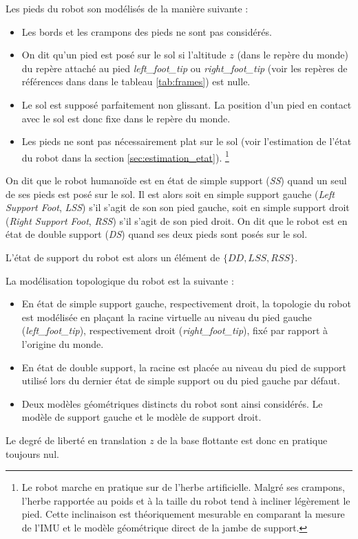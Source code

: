 Les pieds du robot son modélisés de la manière suivante :
\begin{itemize}
    \item Les bords et les crampons des pieds ne sont pas considérés.
    \item On dit qu'un pied est posé sur le sol si l'altitude $z$
    (dans le repère du monde) du repère attaché au pied 
    \textit{left\_foot\_tip} ou \textit{right\_foot\_tip} 
    (voir les repères de références dans dans le tableau \ref{tab:frames})
    est nulle.
    \item Le sol est supposé parfaitement non glissant. 
    La position d'un pied en contact avec le sol est donc fixe 
    dans le repère du monde.
    \item Les pieds ne sont pas nécessairement plat sur le sol 
    (voir l'estimation de l'état du robot dans la section \ref{sec:estimation_etat}).
    \footnote{Le robot marche en pratique sur de l'herbe artificielle. 
    Malgré ses crampons, l'herbe rapportée au poids et à la taille du robot tend à incliner légèrement le pied.
    Cette inclinaison est théoriquement mesurable en comparant la mesure de l'IMU 
    et le modèle géométrique direct de la jambe de support.}
\end{itemize}

\begin{definition}
    On dit que le robot humanoïde est en état de simple support (\textit{SS}) quand
    un seul de ses pieds est posé sur le sol. 
    Il est alors soit en simple support gauche (\textit{Left Support Foot}, \textit{LSS}) 
    s'il s'agit de son son pied gauche, soit en simple support droit 
    (\textit{Right Support Foot}, \textit{RSS}) s'il s'agit de son pied droit.
    On dit que le robot est en état de double support (\textit{DS}) quand ses deux pieds
    sont posés sur le sol.
\end{definition}
L'état de support du robot est alors un élément de $\{DD, LSS, RSS\}$.

La modélisation topologique du robot est la suivante :
\begin{itemize}
    \item En état de simple support gauche, respectivement droit,
    la topologie du robot est modélisée en plaçant la racine virtuelle
    au niveau du pied gauche (\textit{left\_foot\_tip}), respectivement droit 
    (\textit{right\_foot\_tip}), fixé par rapport à l'origine du monde.
    \item En état de double support, la racine est placée au niveau du 
    pied de support utilisé lors du dernier état de simple support
    ou du pied gauche par défaut.
    \item Deux modèles géométriques distincts du robot sont ainsi considérés.
    Le modèle de support gauche et le modèle de support droit.
\end{itemize}
Le degré de liberté en translation $z$ de la base flottante
est donc en pratique toujours nul.


